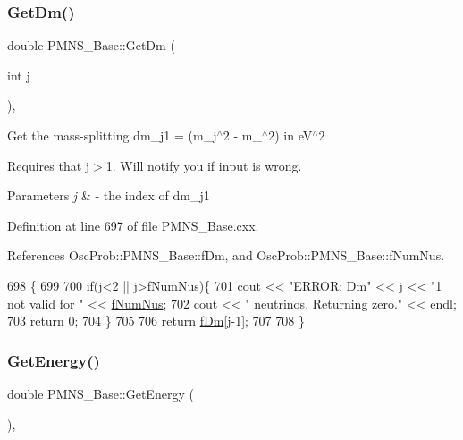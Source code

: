 \subsubsection{\texorpdfstring{Get\+Dm()}{GetDm()}}
{\footnotesize\ttfamily double P\+M\+N\+S\+\_\+\+Base\+::\+Get\+Dm (\begin{DoxyParamCaption}\item[{int}]{j }\end{DoxyParamCaption})\hspace{0.3cm}{\ttfamily [virtual]}, {\ttfamily [inherited]}}

Get the mass-\/splitting dm\+\_\+j1 = (m\+\_\+j$^\wedge$2 -\/ m\+\_$^\wedge$2) in e\+V$^\wedge$2

Requires that j$>$1. Will notify you if input is wrong.


\begin{DoxyParams}{Parameters}
{\em j} & -\/ the index of dm\+\_\+j1 \\
\hline
\end{DoxyParams}


Definition at line 697 of file P\+M\+N\+S\+\_\+\+Base.\+cxx.



References Osc\+Prob\+::\+P\+M\+N\+S\+\_\+\+Base\+::f\+Dm, and Osc\+Prob\+::\+P\+M\+N\+S\+\_\+\+Base\+::f\+Num\+Nus.


\begin{DoxyCode}
698 \{
699 
700   \textcolor{keywordflow}{if}(j<2 || j>\hyperlink{classOscProb_1_1PMNS__Base_a24bb74bed63569dfe88b18fa6a08060e}{fNumNus})\{
701     cout << \textcolor{stringliteral}{"ERROR: Dm"} << j << \textcolor{stringliteral}{"1 not valid for "} << \hyperlink{classOscProb_1_1PMNS__Base_a24bb74bed63569dfe88b18fa6a08060e}{fNumNus};
702     cout << \textcolor{stringliteral}{" neutrinos. Returning zero."} << endl;
703     \textcolor{keywordflow}{return} 0;
704   \}
705 
706   \textcolor{keywordflow}{return} \hyperlink{classOscProb_1_1PMNS__Base_a406a31c3b5d620e5a0cace5b411f9f70}{fDm}[j-1];
707 
708 \}
\end{DoxyCode}
\mbox{\label{classOscProb_1_1PMNS__Base_acc0d46cc4b8f911b40b807225003bbed}} 
\subsubsection{\texorpdfstring{Get\+Energy()}{GetEnergy()}}
{\footnotesize\ttfamily double P\+M\+N\+S\+\_\+\+Base\+::\+Get\+Energy (\begin{DoxyParamCaption}{ }\end{DoxyParamCaption})\hspace{0.3cm}{\ttfamily [virtual]}, {\ttfamily [inherited]}}

